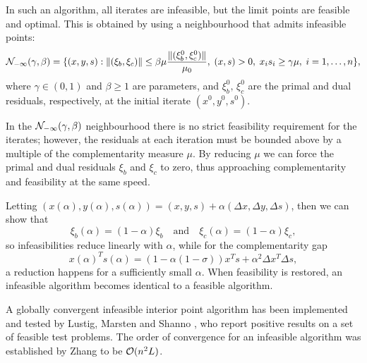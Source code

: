 
In such 
an algorithm, all iterates are infeasible, but the limit points 
are feasible and optimal. This is obtained by using a 
neighbourhood that admits infeasible points:
\[
\mathcal{N}_{-\infty}(\gamma,\beta) =\{ (x,y,s) :
           \|(\xi_b,\xi_c)\| \le \beta\mu \frac{\|(\xi_b^0,\xi_c^0)\|}{\mu_0}, 
	   \; (x,s)>0, \; x_is_i \ge \gamma\mu, \; i = 1, \ldots, n \},
\]
where $\gamma\in (0,1)$ and $\beta \ge 1$ are parameters, and 
$\xi_b^0,\,\xi_c^0$ are the primal and dual residuals, respectively, 
at the initial iterate $(x^0,y^0,s^0)$.

In the $\mathcal{N}_{-\infty}(\gamma,\beta)$ neighbourhood
there is no strict feasibility requirement for 
the iterates; however, the residuals at each iteration must be 
bounded above by a multiple of the complementarity measure $\mu$. 
By reducing $\mu$ we can force the primal and dual residuals 
$\xi_b$ and $\xi_c$ to zero, thus approaching complementarity and 
feasibility at the same speed.


Letting 
$(x(\alpha),y(\alpha),s(\alpha)) =(x,y,s)+\alpha(\Delta x,\Delta y,\Delta s)$,
then we can show that
\[
  \xi_b(\alpha) = (1-\alpha) \xi_b \quad \text{and} \quad 
  \xi_c(\alpha) = (1-\alpha) \xi_c,
\]
so infeasibilities reduce linearly with $\alpha$, while for the 
complementarity gap
\[
  x(\alpha)^Ts(\alpha)=(1-\alpha(1 -\sigma))x^Ts +\alpha^2 \Delta x^T \Delta s,
\]
a reduction happens for a sufficiently small $\alpha$. 
When feasibility is restored, an infeasible algorithm becomes identical
to a feasible algorithm. 

A globally convergent infeasible interior point algorithm has
been implemented and tested by Lustig, Marsten and Shanno
\cite{LustigMarstenShanno94b}, who report positive results on
a set of feasible test problems.
The order of convergence for an infeasible algorithm was
established by Zhang \cite{Zhang94} to be $\mathcal{O}(n^2L)$.


